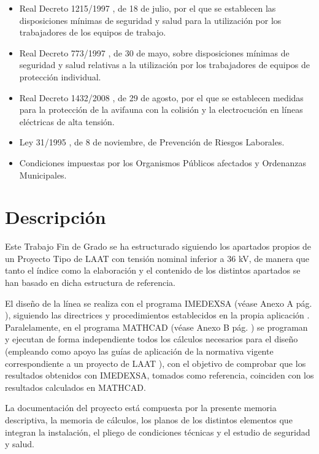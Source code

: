 \begin{itemize}
 \item Real Decreto 1215/1997 \cite{RD1215_1997}, de 18 de julio, por el que se establecen las
 disposiciones mínimas de seguridad y salud para la utilización por
 los trabajadores de los equipos de trabajo.
 \item Real Decreto 773/1997 \cite{RD773_1997}, de 30 de mayo, sobre disposiciones
 mínimas de seguridad y salud relativas a la utilización por los
 trabajadores de equipos de protección individual.
 \item Real Decreto 1432/2008 \cite{RD1432_2008}, de 29 de agosto, por el que se establecen
 medidas para la protección de la avifauna con la colisión y la
 electrocución en líneas eléctricas de alta tensión.
 \item Ley 31/1995 \cite{Ley31_1995_PRL}, de 8 de noviembre, de Prevención de Riesgos
 Laborales.
 \item Condiciones impuestas por los Organismos Públicos afectados y
 Ordenanzas Municipales.
\end{itemize}
\section{Descripción}
\label{sec:md-descripcion}
Este Trabajo Fin de Grado se ha estructurado siguiendo los apartados propios de un Proyecto Tipo de \ac{LAAT} con tensión nominal inferior a 36 kV, de manera que tanto el índice como la elaboración y el contenido de los distintos apartados se han basado en dicha estructura de referencia.

El diseño de la línea se realiza con el programa IMEDEXSA (véase Anexo A pág. \pageref{anexo:imedexsa}), siguiendo las directrices y procedimientos establecidos en la propia aplicación \cite{IMEDEXSA16_ManualUsuario}. Paralelamente, en el programa MATHCAD (véase Anexo B pág. \pageref{anexo:mathcad}) se programan y ejecutan \cite{PTC_MathcadR8_Help} de forma independiente todos los cálculos necesarios para el diseño (empleando como apoyo las guías de aplicación de la normativa vigente correspondiente a un proyecto de \ac{LAAT} \cite{aplicacion_RLAT} \cite{RLAT_2025}), con el objetivo de comprobar que los resultados obtenidos con IMEDEXSA, tomados como referencia, coinciden con los resultados calculados en MATHCAD.

La documentación del proyecto está compuesta por la presente memoria descriptiva, la memoria de cálculos, los planos de los distintos elementos que integran la instalación, el pliego de condiciones técnicas y el estudio de seguridad y salud.
